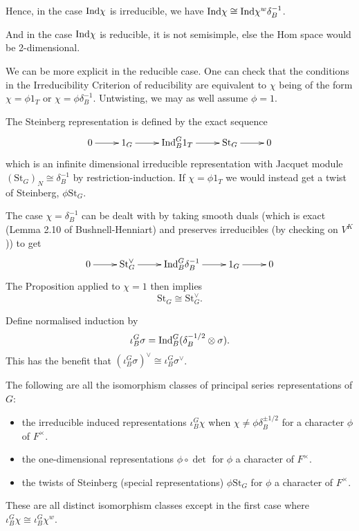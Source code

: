 \begin{rem}
Hence, in the case $\mathrm{Ind} \chi$ is irreducible, we have $\mathrm{Ind} \chi \cong \mathrm{Ind} \chi^w \delta_B^{-1}$.

And in the case $\mathrm{Ind} \chi$ is reducible, it is not semisimple, else the Hom space would be 2-dimensional.
\end{rem}

We can be more explicit in the reducible case. One can check that the conditions in the Irreducibility Criterion of reducibility are equivalent to $\chi$ being of the form $\chi = \phi 1_T$ or $\chi =\phi \delta_B^{-1}$. Untwisting, we may as well assume $\phi=1$.

\begin{defn}
    The Steinberg representation is defined by the exact sequence
    $$\xymatrix{0 \ar[r] & 1_G \ar[r] & \Ind_B^G 1_T \ar[r] & \mathrm{St}_G \ar[r] & 0}$$ which is an infinite dimensional irreducible representation with Jacquet module $(\mathrm{St}_G)_N \cong \delta_B^{-1}$ by restriction-induction. If $\chi =\phi 1_T$ we would instead get a twist of Steinberg, $\phi \mathrm{St}_G$.
\end{defn}

The case $\chi = \delta_B^{-1}$ can be dealt with by taking smooth duals (which is exact (Lemma 2.10 of Bushnell-Henniart) and preserves irreducibles (by checking on $V^K$)) to get 
$$\xymatrix{0 \ar[r] & \mathrm{St}_G^\vee \ar[r] & \Ind_B^G \delta_B^{-1} \ar[r] & 1_G \ar[r] & 0}$$
The Proposition applied to $\chi = 1$ then implies
$$\mathrm{St}_G \cong \mathrm{St}_G^\vee.$$

\begin{notn}
    Define normalised induction by
    $$\iota_B^G \sigma = \mathrm{Ind}_B^G (\delta_B^{-1/2} \otimes \sigma).$$
    This has the benefit that $(\iota_B^G \sigma)^\vee \cong \iota_B^G \sigma^\vee$.
\end{notn}

\begin{thm}\label{classify}
    The following are all the isomorphism classes of principal series representations of $G$:
    \begin{itemize}
        \item the irreducible induced representations $\iota_B^G \chi$ when $\chi \neq \phi \delta_B^{\pm 1/2}$ for a character $\phi$ of $F^\times$.
        \item the one-dimensional representations $\phi \circ \det$ for $\phi$ a character of $F^\times$.
        \item the twists of Steinberg (special representations) $\phi \mathrm{St}_G$ for $\phi$ a character of $F^\times$.
    \end{itemize}
    These are all distinct isomorphism classes except in the first case where $\iota_B^G \chi \cong \iota_B^G \chi^w$.
\end{thm}